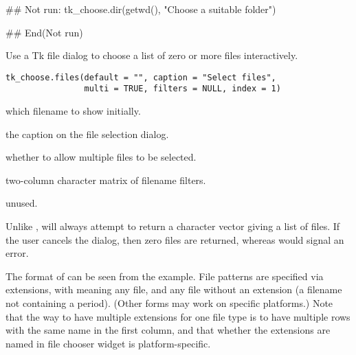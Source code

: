 %
\begin{SeeAlso}\relax
{}
\end{SeeAlso}
%
\begin{Examples}
\begin{ExampleCode}
## Not run: 
tk_choose.dir(getwd(), "Choose a suitable folder")

## End(Not run)
\end{ExampleCode}
\end{Examples}
%
\begin{Description}\relax
Use a Tk file dialog to choose a list of zero or more files 
interactively.
\end{Description}
%
\begin{Usage}
\begin{verbatim}
tk_choose.files(default = "", caption = "Select files",
                multi = TRUE, filters = NULL, index = 1)
\end{verbatim}
\end{Usage}
%
\begin{Arguments}
\begin{ldescription}
\item[\code{default}] which filename to show initially.
\item[\code{caption}] the caption on the file selection dialog.
\item[\code{multi}] whether to allow multiple files to be selected.
\item[\code{filters}] two-column character matrix of filename filters.
\item[\code{index}] unused.
\end{ldescription}
\end{Arguments}
%
\begin{Details}\relax
Unlike ,  will always
attempt to return a character vector giving a list of files.  If the
user cancels the dialog, then zero files are returned, whereas
 would signal an error.

The format of  can be seen from the example.  File
patterns are specified via extensions, with  meaning any
file, and  any file without an extension (a filename not
containing a period).  (Other forms may work on specific platforms.)
Note that the way to have multiple extensions for one file type is to
have multiple rows with the same name in the first column, and that
whether the extensions are named in file chooser widget is
platform-specific. 
\end{Details}
